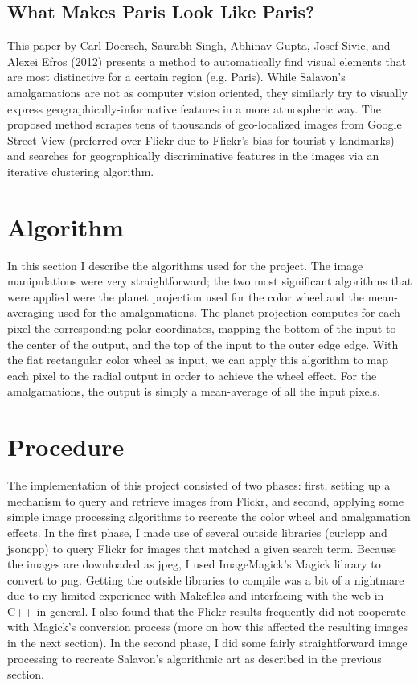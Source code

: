 \documentclass[letterpaper,12pt]{article}
\begin{document}
\subsection{What Makes Paris Look Like Paris?}
This paper by Carl Doersch, Saurabh Singh, Abhinav Gupta, Josef Sivic, and Alexei Efros (2012) presents a method to automatically find visual elements that are most distinctive for a certain region (e.g. Paris). While Salavon's amalgamations are not as computer vision oriented, they similarly try to visually express geographically-informative features in a more atmospheric way. The proposed method scrapes tens of thousands of geo-localized images from Google Street View (preferred over Flickr due to Flickr's bias for tourist-y landmarks) and searches for geographically discriminative features in the images via an iterative clustering algorithm.

\section{Algorithm}
In this section I describe the algorithms used for the project. The image manipulations were very straightforward; the two most significant algorithms that were applied were the planet projection used for the color wheel and the mean-averaging used for the amalgamations. The planet projection computes for each pixel the corresponding polar coordinates, mapping the bottom of the input to the center of the output, and the top of the input to the outer edge edge. With the flat rectangular color wheel as input, we can apply this algorithm to map each pixel to the radial output in order to achieve the wheel effect. For the amalgamations, the output is simply a mean-average of all the input pixels.

\section{Procedure}
The implementation of this project consisted of two phases: first, setting up a mechanism to query and retrieve images from Flickr, and second, applying some simple image processing algorithms to recreate the color wheel and amalgamation effects. In the first phase, I made use of several outside libraries (curlcpp and jsoncpp) to query Flickr for images that matched a given search term. Because the images are downloaded as jpeg, I used ImageMagick's Magick\raisebox{.3\height}{\scalebox{.7}{+}}\raisebox{.3\height}{\scalebox{.7}{+}} library to convert to png. Getting the outside libraries to compile was a bit of a nightmare due to my limited experience with Makefiles and interfacing with the web in C++ in general. I also found that the Flickr results frequently did not cooperate with Magick\raisebox{.3\height}{\scalebox{.7}{+}}\raisebox{.3\height}{\scalebox{.7}{+}}'s conversion process (more on how this affected the resulting images in the next section). In the second phase, I did some fairly straightforward image processing to recreate Salavon's algorithmic art as described in the previous section.
\end{document}

